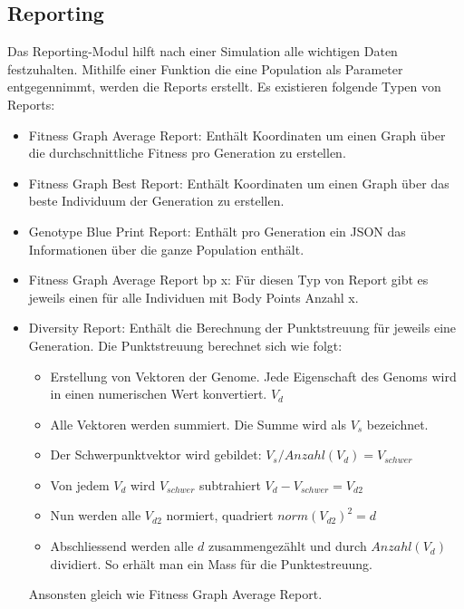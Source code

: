     \subsection{Reporting\label{subsec:Reporting}}

      Das Reporting-Modul hilft nach einer Simulation alle wichtigen Daten festzuhalten.
      Mithilfe einer Funktion die eine Population als Parameter entgegennimmt,
      werden die Reports erstellt. Es existieren folgende Typen von Reports:
      \begin{itemize}
        \item Fitness Graph Average Report: Enthält Koordinaten um einen Graph über die durchschnittliche Fitness pro Generation zu erstellen.
        \item Fitness Graph Best Report: Enthält Koordinaten um einen Graph über das beste Individuum der Generation zu erstellen.
        \item Genotype Blue Print Report: Enthält pro Generation ein JSON das Informationen über die ganze Population enthält.
        \item Fitness Graph Average Report bp x: Für diesen Typ von Report gibt es jeweils einen für alle Individuen mit Body Points Anzahl x.
        \item Diversity Report: Enthält die Berechnung der Punktstreuung für jeweils eine Generation. Die Punktstreuung berechnet sich wie folgt:
        \begin{itemize}
          \item Erstellung von Vektoren der Genome. Jede Eigenschaft des Genoms wird in einen numerischen Wert konvertiert. \( V_d \)
          \item Alle Vektoren werden summiert.  Die Summe wird als \(V_s\) bezeichnet.
          \item Der Schwerpunktvektor wird gebildet: \( V_s / Anzahl(V_d) = V_{schwer} \)
          \item Von jedem \(V_d\) wird \(V_{schwer}\) subtrahiert  \( V_d - V_{schwer}  = V_{d2} \)
          \item Nun werden alle \(V_{d2}\) normiert, quadriert \( norm{(V_{d2})}^2 = d \)
          \item Abschliessend werden alle \(d\) zusammengezählt und durch \(Anzahl(V_d)\) dividiert. So erhält man ein Mass für die Punktestreuung.
        \end{itemize}
        Ansonsten gleich wie Fitness Graph Average Report.
      \end{itemize}

